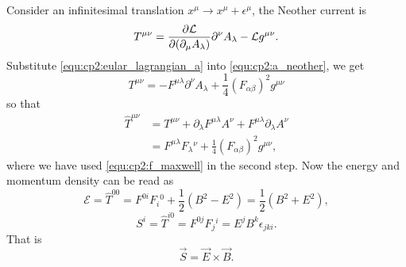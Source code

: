 \begin{problembody}
    \item Consider an infinitesimal translation $x^\mu \to x^\mu + \epsilon^\mu$, the Neother current 
    is 
    \begin{equation}\label{equ:cp2:a_neother}
        T^{\mu\nu} = \frac{\partial \mathcal{L}}{\partial (\partial_\mu A_\lambda)} \partial^\nu A_\lambda - \mathcal{L} g^{\mu\nu}.
    \end{equation}
    Substitute \eqref{equ:cp2:eular_lagrangian_a} into \eqref{equ:cp2:a_neother}, we get
    \begin{equation}
        T^{\mu\nu} = -F^{\mu\lambda} \partial^\nu A_\lambda + \frac{1}{4} (F_{\alpha\beta})^2 g^{\mu\nu}
    \end{equation}
    so that
    \begin{align*}
        \widehat{T}^{\mu\nu} 
        & = T^{\mu\nu} + \partial_\lambda F^{\mu\lambda} A^\nu + F^{\mu\lambda} \partial_\lambda A^\nu \\
        & = F^{\mu\lambda} F_\lambda{}^\nu + \frac{1}{4}(F_{\alpha\beta})^2 g^{\mu\nu},
    \end{align*}
    where we have used \eqref{equ:cp2:f_maxwell} in the second step. Now the energy and momentum density 
    can be read as
    \begin{equation*}
        \mathcal{E} = \widehat{T}^{00} = F^{0i}F_i{}^0 + \frac{1}{2}(B^2 - E^2) = \frac{1}{2} (B^2 + E^2),
    \end{equation*}
    \begin{equation*}
        S^i = \widehat{T}^{i0} = F^{0j}F_j{}^i = E^j B^k \epsilon_{jki}.
    \end{equation*}
    That is
    \begin{equation*}
        \vec{S} = \vec{E} \times \vec{B}.
    \end{equation*}
\end{problembody}

